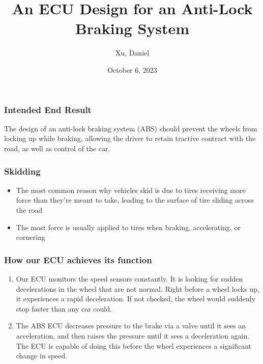\documentclass{beamer}
\title{An ECU Design for an Anti-Lock Braking System}
\author{Xu, Daniel}
\institute{Revature}
\date{October 6, 2023}
\begin{document}
\frame{\titlepage}

\begin{frame}
  \frametitle{Intended End Result}
  The design of an anti-lock braking system (ABS) should prevent the wheels
  from locking up while braking, allowing the driver to retain tractive
  contract with the road, as well as control of the car.
\end{frame}

\begin{frame}
  \frametitle{Skidding}
  \begin{itemize}
  \item The most common reason why vehicles skid is due to tires
    receiving more force than they're meant to take, leading to the surface of
    tire sliding across the road
  \item The most force is usually applied to tires when braking, accelerating, or
    cornering
  \end{itemize}
\end{frame}


\begin{frame}
  \frametitle{How our ECU achieves its function}
  \begin{enumerate}
  \item
    Our ECU monitors the speed sensors constantly. It is looking for
    sudden decelerations in the wheel that are not normal. Right before
    a wheel locks up, it experiences a rapid deceleration. If not
    checked, the wheel would suddenly stop faster than any car could.

  \item The ABS ECU decreases pressure to the brake via a valve until it
    sees an acceleration, and then raises the pressure until it sees a
    deceleration again. The ECU is capable of doing this before the wheel
    experiences a significant change in speed.

%
%
  \end{enumerate}
\end{frame}
\end{document}
